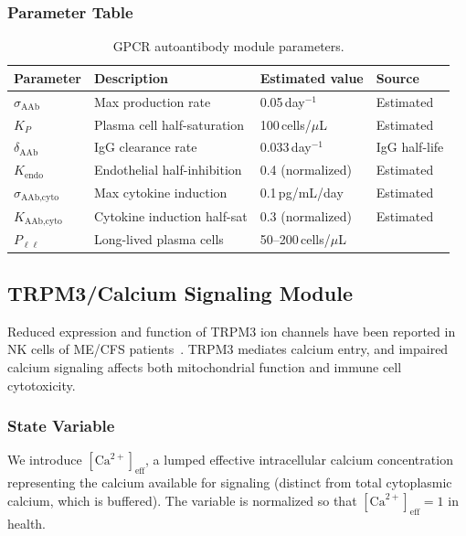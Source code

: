 \subsubsection{Parameter Table}

\begin{table}[htbp]
\centering
\caption{GPCR autoantibody module parameters.}
\label{tab:aab-parameters}
\begin{tabular}{llll}
\hline
Parameter & Description & Estimated value & Source \\
\hline
$\sigma_{\text{AAb}}$ & Max production rate & 0.05\,day$^{-1}$ & Estimated \\
$K_P$ & Plasma cell half-saturation & 100\,cells/$\mu$L & Estimated \\
$\delta_{\text{AAb}}$ & IgG clearance rate & 0.033\,day$^{-1}$ & IgG half-life \\
$K_{\text{endo}}$ & Endothelial half-inhibition & 0.4 (normalized) & Estimated \\
$\sigma_{\text{AAb,cyto}}$ & Max cytokine induction & 0.1\,pg/mL/day & Estimated \\
$K_{\text{AAb,cyto}}$ & Cytokine induction half-sat & 0.3 (normalized) & Estimated \\
$P_{\ell\ell}$ & Long-lived plasma cells & 50--200\,cells/$\mu$L & ~\cite{Fluge2025daratumumab} \\
\hline
\end{tabular}
\end{table}

\subsection{TRPM3/Calcium Signaling Module}
\label{sec:trpm3-model}

Reduced expression and function of TRPM3 ion channels have been reported in NK cells of ME/CFS patients~\cite{Cabanas2021,Sasso2026trpm3}. TRPM3 mediates calcium entry, and impaired calcium signaling affects both mitochondrial function and immune cell cytotoxicity.

\subsubsection{State Variable}

We introduce $[\text{Ca}^{2+}]_{\text{eff}}$, a lumped effective intracellular calcium concentration representing the calcium available for signaling (distinct from total cytoplasmic calcium, which is buffered). The variable is normalized so that $[\text{Ca}^{2+}]_{\text{eff}} = 1$ in health.

